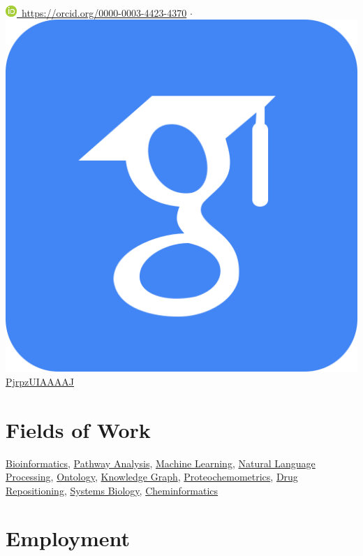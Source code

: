 \documentclass[10pt,a4paper,sans]{moderncv} %
\newcommand{\wikidata}[2]{\href{https://bioregistry.io/wikidata:#1?provider=scholia}{{#2}}}
\begin{document}
\\
\href{https://orcid.org/0000-0003-4423-4370}{\includegraphics[scale=0.5]{img/ORCIDiD_icon16x16}\ https://orcid.org/0000-0003-4423-4370}
$\cdot$
\href{https://scholar.google.com/citations?user=PjrpzUIAAAAJ}{\includegraphics[scale=0.015625]{img/google_scholar_icon_130918} PjrpzUIAAAAJ}

\section{Fields of Work}\label{sec:fields}

    \wikidata{Q128570}{Bioinformatics},     \wikidata{Q25303877}{Pathway Analysis},     \wikidata{Q2539}{Machine Learning},     \wikidata{Q30642}{Natural Language Processing},     \wikidata{Q324254}{Ontology},     \wikidata{Q33002955}{Knowledge Graph},     \wikidata{Q50327360}{Proteochemometrics},     \wikidata{Q5308921}{Drug Repositioning},     \wikidata{Q815297}{Systems Biology},     \wikidata{Q910164}{Cheminformatics}

\section{Employment}\label{sec:employment}
\end{document}
